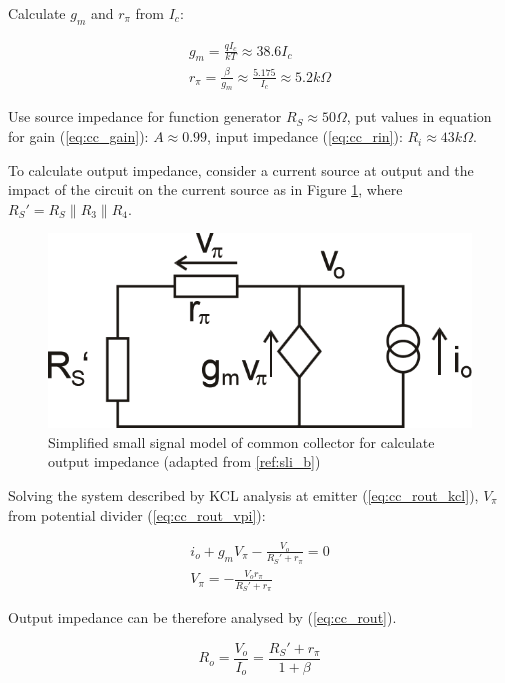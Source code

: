 \documentclass[a4paper,notitlepage,10pt]{report}
\begin{document}
\begin{multicols}{2}
Calculate $g_m$ and $r_\pi$ from $I_c$:
\parskip=0pt

\begin{gather}
	\label{eq:gm}
	g_m = \frac{q I_c}{k T} \approx 38.6 I_c \\
	\label{eq:rpi}
	r_\pi = \frac{\beta}{g_m} \approx \frac{5.175}{I_c} \approx 5.2k\Omega
\end{gather}
\parskip=6pt

Use source impedance for function generator $R_S \approx 50\Omega$, put values in equation for gain (\ref{eq:cc_gain}): $A \approx 0.99$, input impedance (\ref{eq:cc_rin}): $R_i \approx 43k\Omega$.

To calculate output impedance, consider a current source at output and the impact of the circuit on the current source as in Figure \ref{fig:cc_rout}, where $R_S' = R_S \| R_3 \| R_4$.
\parskip=0pt

\begin{figure}[H]
	\centering
	\includegraphics[width=\columnwidth]{cc_rout}
	\caption{Simplified small signal model of common collector for calculate output impedance (adapted from \ref{ref:sli_b})}
	\label{fig:cc_rout}
\end{figure}
\parskip=6pt

Solving the system described by KCL analysis at emitter (\ref{eq:cc_rout_kcl}), $V_\pi$ from potential divider (\ref{eq:cc_rout_vpi}):
\parskip=0pt

\begin{gather}
	\label{eq:cc_rout_kcl}
	i_o + g_m V_\pi - \frac{V_o}{R_S' + r_\pi} = 0 \\
	\label{eq:cc_rout_vpi}
	V_\pi = -\frac{V_o r_\pi}{R_S' + r_\pi}
\end{gather}
\parskip=6pt

Output impedance can be therefore analysed by (\ref{eq:cc_rout}).
\parskip=0pt

\begin{equation}
	\label{eq:cc_rout}
	R_o = \frac{V_o}{I_o} = \frac{R_S' + r_\pi}{1 + \beta}
\end{equation}
\parskip=6pt


\end{multicols}
\end{document}
